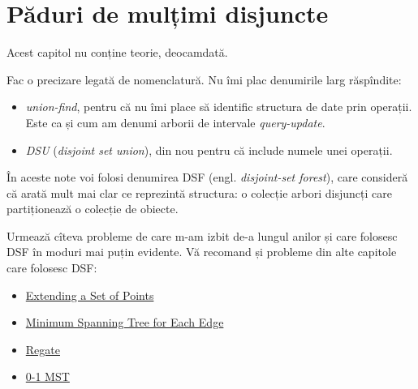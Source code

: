 \chapter{Păduri de mulțimi disjuncte}

Acest capitol nu conține teorie, deocamdată.

Fac o precizare legată de nomenclatură. Nu îmi plac denumirile larg răspîndite:

\begin{itemize}
  \item \textit{union-find}, pentru că nu îmi place să identific structura de date prin operații. Este ca și cum am denumi arborii de intervale \textit{query-update}.
  \item \textit{DSU} (\textit{disjoint set union}), din nou pentru că include numele unei operații.
\end{itemize}

În aceste note voi folosi denumirea DSF (engl. \textit{disjoint-set forest}), care consideră că arată mult mai clar ce reprezintă structura: o colecție arbori disjuncți care partiționează o colecție de obiecte.

Urmează cîteva probleme de care m-am izbit de-a lungul anilor și care folosesc DSF în moduri mai puțin evidente. Vă recomand și probleme din alte capitole care folosesc DSF:

\begin{itemize}
  \item \hyperref[problem:extending-a-set-of-points]{Extending a Set of Points}
  \item \hyperref[problem:mst-for-each-edge]{Minimum Spanning Tree for Each Edge}
  \item \hyperref[problem:regate]{Regate}
  \item \hyperref[problem:0-1-mst]{0-1 MST}
\end{itemize}

